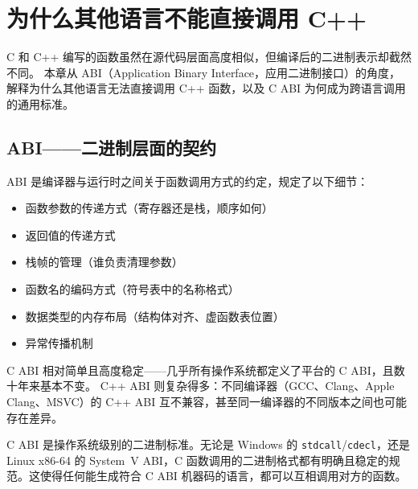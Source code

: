 \documentclass[12pt,a4paper,fontset=fandol]{ctexbook}
\newcommand{\cpp}[1]{C++#1}
\begin{document}
  \chapter*{\contentsname}%
  \@mkboth{\contentsname}{\contentsname}%
  \clearpage
\else
  \tableofcontents
\fi
\makeatother

\mainmatter

\chapter{为什么其他语言不能直接调用 C++}

C 和 \cpp{} 编写的函数虽然在源代码层面高度相似，但编译后的二进制表示却截然不同。
本章从 ABI（Application Binary Interface，应用二进制接口）的角度，解释为什么其他语言无法直接调用 \cpp{} 函数，以及 C ABI 为何成为跨语言调用的通用标准。

\section{ABI——二进制层面的契约}

ABI 是编译器与运行时之间关于函数调用方式的约定，规定了以下细节：

\begin{itemize}[nosep]
\item 函数参数的传递方式（寄存器还是栈，顺序如何）
\item 返回值的传递方式
\item 栈帧的管理（谁负责清理参数）
\item 函数名的编码方式（符号表中的名称格式）
\item 数据类型的内存布局（结构体对齐、虚函数表位置）
\item 异常传播机制
\end{itemize}

C ABI 相对简单且高度稳定——几乎所有操作系统都定义了平台的 C ABI，且数十年来基本不变。
\cpp{} ABI 则复杂得多：不同编译器（GCC、Clang、Apple Clang、MSVC）的 \cpp{} ABI 互不兼容，甚至同一编译器的不同版本之间也可能存在差异。

\begin{tcolorbox}[guideline={C ABI 的通用性}]
C ABI 是操作系统级别的二进制标准。无论是 Windows 的 \texttt{stdcall}/\allowbreak{}\texttt{cdecl}，还是 Linux x86-64 的 System~V ABI，C 函数调用的二进制格式都有明确且稳定的规范。这使得任何能生成符合 C ABI 机器码的语言，都可以互相调用对方的函数。
\end{tcolorbox}
\end{document}
